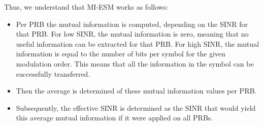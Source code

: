 
Thus, we understand that MI-ESM works as follows:

\begin{itemize}
    \item Per PRB the mutual information is computed, depending on the SINR for that PRB. For low SINR, the mutual information is zero, meaning that no useful information can be extracted for that PRB. For high SINR, the mutual information is equal to the number of bits per symbol for the given modulation order. This means that all the information in the symbol can be successfully transferred.
    \item Then the average is determined of these mutual information values per PRB.
    \item Subsequently, the effective SINR is determined as the SINR that would yield this average mutual information if it were applied on all PRBs.
\end{itemize}

